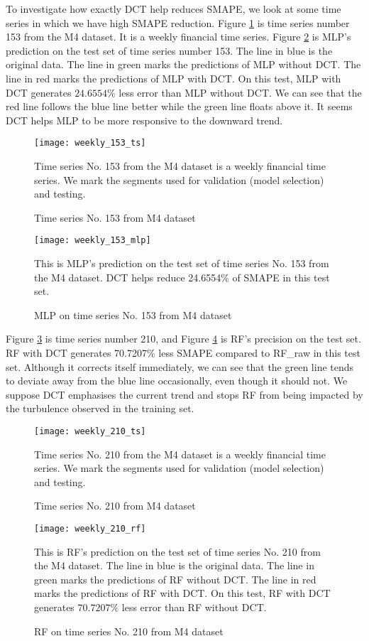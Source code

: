 To investigate how exactly DCT help reduces SMAPE, we look at some time series in which we have high SMAPE reduction. Figure \ref{fig: weekly 153 ts} is time series number 153 from the M4 dataset. It is a weekly financial time series. Figure \ref{fig: weekly 153 mlp} is MLP's prediction on the test set of time series number 153. The line in blue is the original data. The line in green marks the predictions of MLP without DCT. The line in red marks the predictions of MLP with DCT. On this test, MLP with DCT generates $24.6554\%$ less error than MLP without DCT. We can see that the red line follows the blue line better while the green line floats above it. It seems DCT helps MLP to be more responsive to the downward trend.
\begin{figure}[H]
    \centering
    \texttt{[image: weekly\_153\_ts]}
    \caption{Time series No. 153 from M4 dataset}
    {\raggedright \footnotesize Time series No. 153 from the M4 dataset is a weekly financial time series. We mark the segments used for validation (model selection) and testing.\par}
    \label{fig: weekly 153 ts}
\end{figure}
\begin{figure}[H]
    \centering
    \texttt{[image: weekly\_153\_mlp]}
    \caption{MLP on time series No. 153 from M4 dataset}
    {\raggedright \footnotesize This is MLP's prediction on the test set of time series No. 153 from the M4 dataset. DCT helps reduce 24.6554\% of SMAPE in this test set.\par}
    \label{fig: weekly 153 mlp}
\end{figure}
Figure \ref{fig: weekly 210 ts} is time series number 210, and Figure \ref{fig: weekly 210 rf} is RF's precision on the test set. RF with DCT generates 70.7207\% less SMAPE compared to RF\_raw in this test set. Although it corrects itself immediately, we can see that the green line tends to deviate away from the blue line occasionally, even though it should not. We suppose DCT emphasises the current trend and stops RF from being impacted by the turbulence observed in the training set.
\begin{figure}[H]
    \centering
    \texttt{[image: weekly\_210\_ts]}
    \caption{Time series No. 210 from M4 dataset}
    {\raggedright \footnotesize Time series No. 210 from the M4 dataset is a weekly financial time series. We mark the segments used for validation (model selection) and testing.\par}
    \label{fig: weekly 210 ts}
\end{figure}
\begin{figure}[H]
    \centering
    \texttt{[image: weekly\_210\_rf]}
    \caption{RF on time series No. 210 from M4 dataset}
    {\raggedright \footnotesize This is RF's prediction on the test set of time series No. 210 from the M4 dataset. The line in blue is the original data. The line in green marks the predictions of RF without DCT. The line in red marks the predictions of RF with DCT. On this test, RF with DCT generates $70.7207\%$ less error than RF without DCT. \par}
    \label{fig: weekly 210 rf}
\end{figure}

